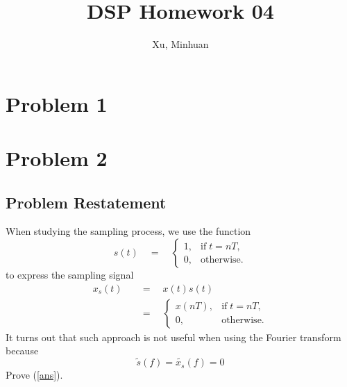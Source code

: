 \documentclass{article}
\begin{document}
\title{DSP Homework 04}
\author{Xu, Minhuan}
\maketitle
\tableofcontents
\begin{abstract}


\end{abstract}

\section{Problem 1}

\section{Problem 2}
\subsection{Problem Restatement}
When studying the sampling process, we use the function
\begin{equation}
    s(t) \quad = \quad \left\{ 
        \begin{array}{lr}
            1, & \mathrm{if}\; t = nT,\\
            0, & \mathrm{otherwise.}
        \end{array}
    \right.
\end{equation}
to express the sampling signal
\begin{align}
    x_s(t) \quad &= \quad x(t)s(t)\\
    &= \quad \left\{
        \begin{array}{lr}
            x(nT), & \mathrm{if}\; t = nT,\\
            0, & \mathrm{otherwise.}
        \end{array}
    \right.
\end{align}
It turns out that such approach is not useful when using the Fourier transform because
\begin{equation}
    \widetilde{s}(f) = \widetilde{x_s}(f) = 0 
    \label{ans}
\end{equation}
Prove (\ref{ans}).
\end{document}
